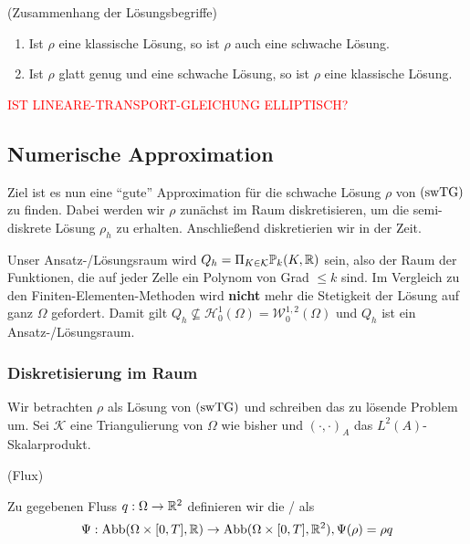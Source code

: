 \begin{Lemma}(Zusammenhang der Lösungsbegriffe)
	
	\begin{enumerate}
		\item Ist $ \rho $ eine klassische Lösung, so ist $ \rho $ auch eine schwache Lösung.
		\item Ist $ \rho $ glatt genug und eine schwache Lösung, so ist $ \rho $ eine klassische Lösung. 
	\end{enumerate}
\end{Lemma}

\textcolor{red}{IST LINEARE-TRANSPORT-GLEICHUNG ELLIPTISCH?}

\subsection{Numerische Approximation}
Ziel ist es nun eine \enquote{gute} Approximation für die schwache Lösung $ \rho $ von $ \operatorname{(swTG)} $ zu finden. Dabei werden wir $ \rho $ zunächst im Raum diskretisieren,  um die semi-diskrete Lösung $ \rho_h $ zu erhalten. Anschließend diskretierien wir in der Zeit.

Unser  Ansatz-/Lösungsraum wird $Q_h = \Pi_{K \in \mathcal{K}}  \mathbb{P}_k(K,\mathbb{R}) $ sein, also der Raum der Funktionen, die auf jeder Zelle ein Polynom von Grad $ \leq k $ sind. Im Vergleich zu den Finiten-Elementen-Methoden wird \textbf{nicht} mehr die Stetigkeit der Lösung auf ganz $ \Omega $ gefordert. Damit gilt $ Q_h \not \subseteq \mathcal{H}^1_0(\Omega)=\mathcal{W}^{1,2}_0(\Omega) $ und $ Q_h $ ist ein  Ansatz-/Lösungsraum.

\subsubsection{Diskretisierung im Raum}
Wir betrachten $ \rho $ als Lösung von $ \operatorname{(swTG)} $ und schreiben das zu lösende Problem um. Sei $ \mathcal{K} $ eine Triangulierung von $ \Omega $ wie bisher und $ (\cdot,\cdot)_A $ das $ L^2(A) $-Skalarprodukt. 
\begin{define}(Flux)
	
	Zu gegebenen Fluss $ q:\Omega \to \mathbb{R}^2 $ definieren wir die / als
	\[ \Psi: \operatorname{Abb}(\Omega \times [0,T], \mathbb{R}) \to \operatorname{Abb}(\Omega \times [0,T], \mathbb{R}^2), \Psi(\rho) = \rho q \]
\end{define}

